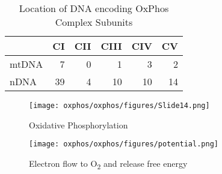 \documentclass{scrartcl}
\begin{document}
\begin{table}[htbp]
\caption{\label{tab:org2c6e37d}Location of DNA encoding OxPhos Complex Subunits}
\centering
\begin{tabular}{lrrrrr}
 & CI & CII & CIII & CIV & CV\\
\hline
mtDNA & 7 & 0 & 1 & 3 & 2\\
nDNA & 39 & 4 & 10 & 10 & 14\\
\end{tabular}
\end{table}

\begin{figure}[htbp]
\centering
\texttt{[image: oxphos/oxphos/figures/Slide14.png]}
\caption[ETC]{\label{fig:org8c8c555}Oxidative Phosphorylation}
\end{figure}

\begin{figure}[htbp]
\centering
\texttt{[image: oxphos/oxphos/figures/potential.png]}
\caption[redox]{\label{fig:org8e6f920}Electron flow to O\textsubscript{2} and release free energy}
\end{figure}
\end{document}
